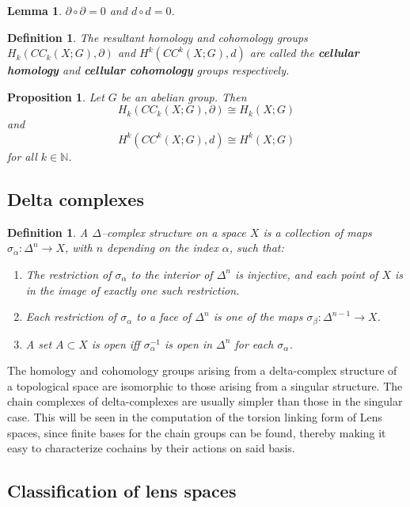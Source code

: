\documentclass{article}
\newtheorem{definition}[theorem]{Definition}
\newtheorem{lemma}[theorem]{Lemma}
\newtheorem{proposition}[theorem]{Proposition}
\begin{document}
\begin{lemma}
$\partial\circ\partial=0$ and $d\circ d=0$.
\end{lemma}

\begin{definition}
The resultant homology and cohomology groups $H_k(CC_k(X;G),\partial)$ and $H^k(CC^k(X;G),d)$ are called the \textbf{cellular homology} and \textbf{cellular cohomology} groups respectively.
\end{definition}

\begin{proposition}
Let $G$ be an abelian group. Then\[H_k(CC_k(X;G),\partial)\cong H_k(X;G)\] and \[H^k(CC^k(X;G),d)\cong H^k(X;G)\] for all $k\in\mathbb{N}$.
\end{proposition}

\subsection{Delta complexes}
\begin{definition}
A $\Delta$--complex structure on a space $X$ is a collection of maps $\sigma_\alpha\colon\Delta^n\to X$, with $n$ depending on the index $\alpha$, such that:
\begin{enumerate}
    \item The restriction of $\sigma_\alpha$ to the interior of $\Delta^n$ is injective, and each point of $X$ is in the image of exactly one such restriction.
    \item Each restriction of $\sigma_\alpha$ to a face of $\Delta^n$ is one of the maps $\sigma_\beta\colon\Delta^{n-1}\to X$.
    \item A set $A\subset X$ is open iff $\sigma_\alpha^{-1}$ is open in $\Delta^n$ for each $\sigma_\alpha$.
\end{enumerate}
\end{definition}

The homology and cohomology groups arising from a delta-complex structure of a topological space are isomorphic to those arising from a singular structure. The chain complexes of delta-complexes are usually simpler than those in the singular case. This will be seen in the computation of the torsion linking form of Lens spaces, since finite bases for the chain groups can be found, thereby making it easy to characterize cochains by their actions on said basis.




\subsection{Classification of lens spaces}
\end{document}
